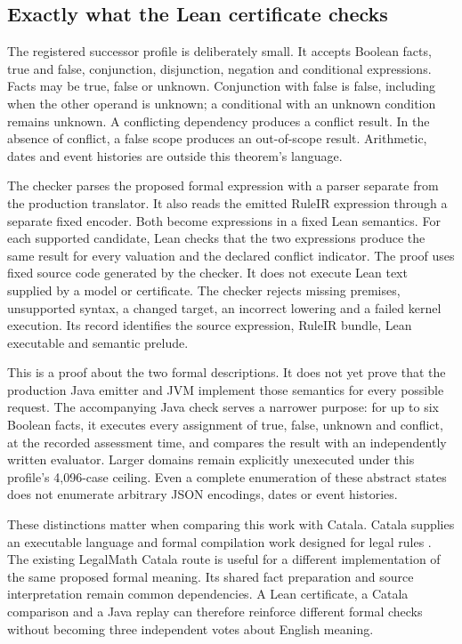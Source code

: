 \subsection{Exactly what the Lean certificate checks}

The registered successor profile is deliberately small. It accepts Boolean
facts, true and false, conjunction, disjunction, negation and conditional
expressions. Facts may be true, false or unknown. Conjunction with false is
false, including when the other operand is unknown; a conditional with an
unknown condition remains unknown. A conflicting dependency produces a conflict
result. In the absence of conflict, a false scope produces an out-of-scope result. Arithmetic, dates and
event histories are outside this theorem's language.

The checker parses the proposed formal expression with a parser separate from
the production translator. It also reads the emitted RuleIR expression through
a separate fixed encoder. Both become expressions in a fixed Lean semantics.
For each supported candidate, Lean checks that the two expressions produce the
same result for every valuation and the declared conflict indicator. The proof
uses fixed source code generated by the checker. It does not execute Lean text
supplied by a model or certificate. The checker rejects missing premises,
unsupported syntax, a changed target, an incorrect lowering and a failed kernel
execution. Its record identifies the source expression, RuleIR bundle, Lean
executable and semantic prelude.

This is a proof about the two formal descriptions. It does not yet prove that
the production Java emitter and JVM implement those semantics for every possible
request. The accompanying Java check serves a narrower purpose: for up to six
Boolean facts, it executes every assignment of true, false, unknown and conflict,
at the recorded assessment time, and compares the result with an independently
written evaluator. Larger domains remain explicitly unexecuted under this
profile's 4,096-case ceiling. Even a complete enumeration of these abstract
states does not enumerate arbitrary JSON encodings, dates or event histories.

These distinctions matter when comparing this work with Catala. Catala supplies
an executable language and formal compilation work designed for legal rules
\citep{catala2021}. The existing LegalMath Catala route is useful for a different
implementation of the same proposed formal meaning. Its shared fact preparation
and source interpretation remain common dependencies. A Lean certificate, a
Catala comparison and a Java replay can therefore reinforce different formal
checks without becoming three independent votes about English meaning.

